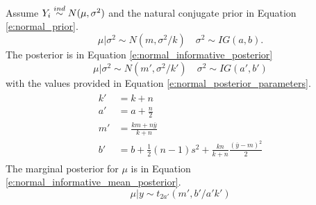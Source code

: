 Assume $Y_i\stackrel{ind}{\sim} N(\mu,\sigma^2)$ and the natural conjugate prior in Equation
\eqref{e:normal_prior}.
\begin{equation}
\mu|\sigma^2 \sim N(m,\sigma^2/k) \quad \sigma^2 \sim IG(a,b).
\label{e:normal_prior}
\end{equation}
The posterior is in Equation \eqref{e:normal_informative_posterior}
\begin{equation}
\mu|\sigma^2 \sim N(m',\sigma^2/k') \quad \sigma^2 \sim IG(a',b') 
\label{e:normal_informative_posterior}
\end{equation}
with the values provided
in Equation \eqref{e:normal_posterior_parameters}.
\begin{align}
\begin{split}
k' &= k + n \\
a' &= a + \frac{n}{2} \\
m' &= \frac{km+n\overline{y}}{k+n} \\
b' &= b + \frac{1}{2} (n-1) s^2 + \frac{kn}{k+n}\frac{(\overline{y}-m)^2}{2} 
\end{split}
\label{e:normal_posterior_parameters}
\end{align}
The marginal posterior for $\mu$ is in Equation 
\eqref{e:normal_informative_mean_posterior}.
\begin{equation}
\mu|y \sim t_{2a'}(m',b'/a'k')
\label{e:normal_informative_mean_posterior}
\end{equation}

